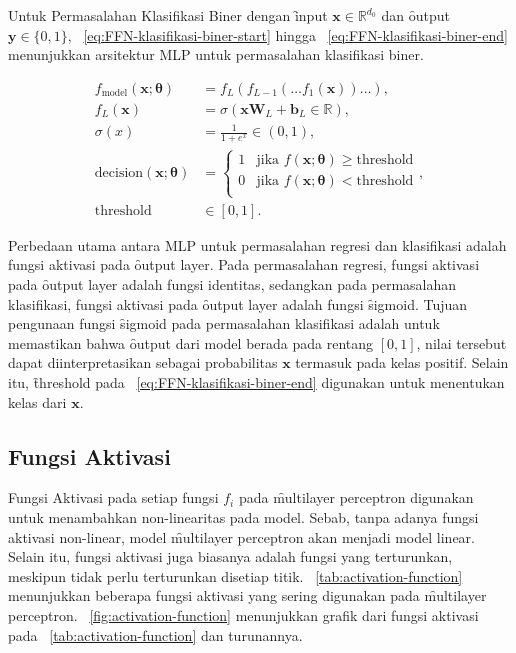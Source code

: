     Untuk Permasalahan Klasifikasi Biner dengan \f{input} $\mathbf{x}\in \mathbb{R}^{d_0}$ dan \f{output} $\mathbf{y} \in \{0, 1\}$, \equ~\ref{eq:FFN-klasifikasi-biner-start} hingga \equ~\ref{eq:FFN-klasifikasi-biner-end} menunjukkan arsitektur MLP untuk permasalahan klasifikasi biner.

    \begin{align}
        \label{eq:FFN-klasifikasi-biner-start}
        f_{\text{model}}(\mathbf{x};\bm{\theta}) &= f_L(f_{L-1}(\dots f_1(\mathbf{x})) \dots), \\
        f_L(\mathbf{x}) &= \sigma(\mathbf{x} \mathbf{W}_L + \mathbf{b}_L \in \mathbb{R}), \\
        \sigma(x) &= \frac{1}{1 + e^{x}} \in (0, 1), \\
        \text{decision}(\mathbf{x};\bm{\theta}) &= \begin{cases}
        1 & \text{jika } f(\mathbf{x};\bm{\theta}) \geq \text{threshold} \\
        0 & \text{jika } f(\mathbf{x};\bm{\theta}) < \text{threshold} \\
        \end{cases}, \\
        \label{eq:FFN-klasifikasi-biner-end}
        \text{threshold}&\in [0, 1].
    \end{align}

    Perbedaan utama antara MLP untuk permasalahan regresi dan klasifikasi adalah fungsi aktivasi pada \f{output layer}. Pada permasalahan regresi, fungsi aktivasi pada \f{output layer} adalah fungsi identitas, sedangkan pada permasalahan klasifikasi, fungsi aktivasi pada \f{output layer} adalah fungsi \f{sigmoid}. Tujuan pengunaan fungsi \f{sigmoid} pada permasalahan klasifikasi adalah untuk memastikan bahwa \f{output} dari model berada pada rentang $[0, 1]$, nilai tersebut dapat diinterpretasikan sebagai probabilitas $\mathbf{x}$ termasuk pada kelas positif. Selain itu, \f{threshold} pada \equ~\ref{eq:FFN-klasifikasi-biner-end} digunakan untuk menentukan kelas dari $\mathbf{x}$.

    \subsection{Fungsi Aktivasi}

    Fungsi Aktivasi pada setiap fungsi $f_i$ pada \f{multilayer perceptron} digunakan untuk menambahkan non-linearitas pada model. Sebab, tanpa adanya fungsi aktivasi non-linear, model \f{multilayer perceptron} akan menjadi model linear. Selain itu, fungsi aktivasi juga biasanya adalah fungsi yang terturunkan, meskipun tidak perlu terturunkan disetiap titik. \tab~\ref{tab:activation-function} menunjukkan beberapa fungsi aktivasi yang sering digunakan pada \f{multilayer perceptron}. \pic~\ref{fig:activation-function} menunjukkan grafik dari fungsi aktivasi pada \tab~\ref{tab:activation-function} dan turunannya.

